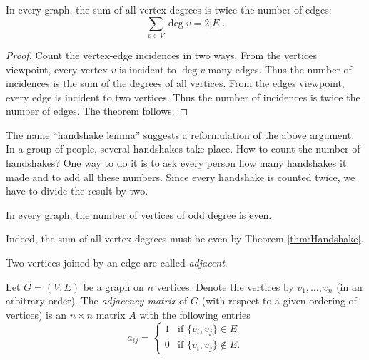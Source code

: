 \begin{page}

\begin{thm}
\label{thm:Handshake}
In every graph, the sum of all vertex degrees is twice the number of edges:
\[
\sum_{v \in V} \deg v = 2 |E|.
\]
\end{thm}

\end{page}

\begin{page}

\begin{proof}
Count the vertex-edge incidences in two ways.
From the vertices viewpoint, every vertex $v$ is incident to $\deg v$ many edges.
Thus the number of incidences is the sum of the degrees of all vertices.
From the edges viewpoint, every edge is incident to two vertices.
Thus the number of incidences is twice the number of edges.
The theorem follows.
\end{proof}
The name ``handshake lemma'' suggests a reformulation of the above argument.
In a group of people, several handshakes take place. How to count the number of handshakes?
One way to do it is to ask every person how many handshakes it made and to add all these numbers.
Since every handshake is counted twice, we have to divide the result by two.


\end{page}

\begin{page}

\begin{cor}
In every graph, the number of vertices of odd degree is even.
\end{cor}

\end{page}

\begin{page}

Indeed, the sum of all vertex degrees must be even by Theorem \ref{thm:Handshake}.

Two vertices joined by an edge are called \emph{adjacent}.


\end{page}

\begin{page}

\begin{dfn}
Let $G = (V, E)$ be a graph on $n$ vertices.
Denote the vertices by $v_1, \ldots, v_n$ (in an arbitrary order).
The \emph{adjacency matrix} of $G$ (with respect to a given ordering of vertices) is an $n \times n$ matrix $A$ with the following entries
\[
a_{ij} =
\begin{cases}
1 &\text{if } \{v_i, v_j\} \in E\\
0 &\text{if } \{v_i, v_j\} \notin E.
\end{cases}
\]
\end{dfn}

\end{page}

